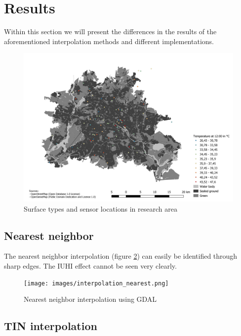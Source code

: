 
\section{Results}

Within this section we will present the differences in the results of the aforementioned interpolation methods and different implementations. 

\begin{figure}
	\includegraphics[width=\linewidth]{comparison/berlin.png}
	\caption{Surface types and sensor locations in research area}
	\label{fig:result_berlin}
\end{figure}

\subsection{Nearest neighbor}

The nearest neighbor interpolation (figure \ref{fig:result_nearest}) can easily be identified through sharp edges. The IUHI effect cannot be seen very clearly.

\begin{figure}
	\texttt{[image: images/interpolation\_nearest.png]}
	\caption{Nearest neighbor interpolation using GDAL}
	\label{fig:result_nearest}
\end{figure}

\subsection{TIN interpolation}

